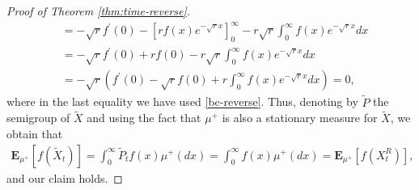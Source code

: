 \documentclass[11pt,a4paper]{article}
\theoremstyle{definition}
\theoremstyle{remark}
\begin{document}
\begin{proof}[Proof of Theorem \ref{thm:time-reverse}]
\begin{align*}
			&=-\sqrt{r} f^\prime(0) - [r f(x) e^{-\sqrt{r} x}]^\infty_0 - r\sqrt{r} \int_0^\infty f(x) e^{-\sqrt{r}x} dx\\
			&= -\sqrt{r} f^\prime(0) + r f(0) - r\sqrt{r} \int_0^\infty f(x) e^{-\sqrt{r}x} dx\\
			&= -\sqrt{r}(f^\prime(0) - \sqrt{r} f(0) + r \int_0^\infty f(x) e^{-\sqrt{r} x} dx)=0,
		\end{align*}
		where in the last equality we have used \eqref{bc-reverse}. %
		Thus, denoting by \(\widetilde{P}\) the semigroup of \(\widetilde{X}\) and using the fact that \(\mu^+\) is also a stationary measure for \(\widetilde{X}\), we obtain that 
		\begin{align*}
			\mathbf{E}_{\mu^+}[f(\widetilde{X}_t)]=\int_0^\infty \widetilde{P}_tf(x) \mu^+(dx)=\int_0^\infty f(x) \mu^+(dx)=\mathbf{E}_{\mu^+}[f(X^R_{t})],
		\end{align*}
		and our claim holds.
	\end{proof}
\end{document}
